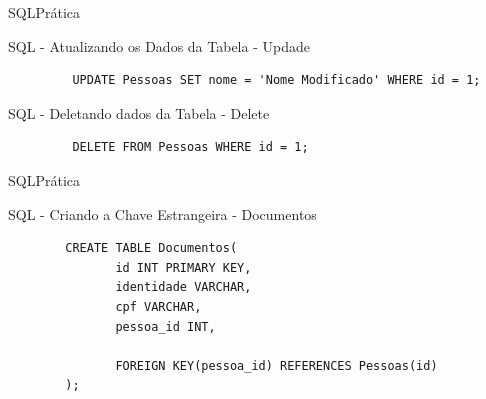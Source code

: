 \documentclass{beamer}
\begin{document}
\begin{frame}[fragile]{SQL}{Prática}
	\begin{block} {SQL - Atualizando os Dados da Tabela - Updade}
		\begin{verbatim}
		 UPDATE Pessoas SET nome = 'Nome Modificado' WHERE id = 1;
		\end{verbatim}
	\end{block}
	\vline
	\begin{block} {SQL - Deletando dados da Tabela - Delete}
		\begin{verbatim}
		 DELETE FROM Pessoas WHERE id = 1;
		\end{verbatim}
	\end{block}
\end{frame}

%			

%		

\begin{frame}[fragile]{SQL}{Prática}
	\begin{block} {SQL - Criando a Chave Estrangeira - Documentos}
		\begin{verbatim}
		CREATE TABLE Documentos(
		       id INT PRIMARY KEY, 
		       identidade VARCHAR, 
		       cpf VARCHAR,  
		       pessoa_id INT,
		
		       FOREIGN KEY(pessoa_id) REFERENCES Pessoas(id)
		);
		\end{verbatim}
	\end{block}
\end{frame}
\end{document}
